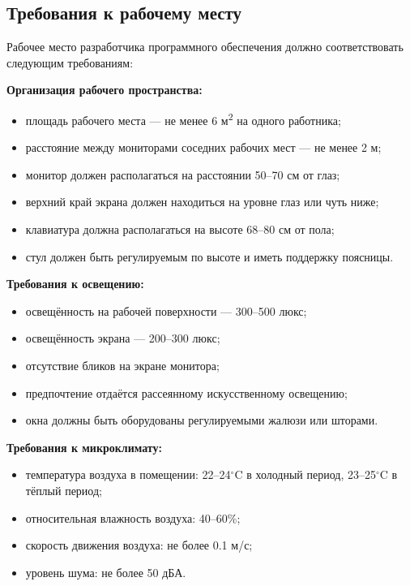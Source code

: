 \documentclass[14pt,a4paper,oneside]{extarticle}
\begin{document}
\subsection{Требования к рабочему месту}

Рабочее место разработчика программного обеспечения должно соответствовать следующим требованиям:

\textbf{Организация рабочего пространства:}
\begin{itemize}[leftmargin=2cm]
    \item площадь рабочего места --- не менее 6 м\textsuperscript{2} на одного работника;
    \item расстояние между мониторами соседних рабочих мест --- не менее 2 м;
    \item монитор должен располагаться на расстоянии 50--70 см от глаз;
    \item верхний край экрана должен находиться на уровне глаз или чуть ниже;
    \item клавиатура должна располагаться на высоте 68--80 см от пола;
    \item стул должен быть регулируемым по высоте и иметь поддержку поясницы.
\end{itemize}

\textbf{Требования к освещению:}
\begin{itemize}[leftmargin=2cm]
    \item освещённость на рабочей поверхности --- 300--500 люкс;
    \item освещённость экрана --- 200--300 люкс;
    \item отсутствие бликов на экране монитора;
    \item предпочтение отдаётся рассеянному искусственному освещению;
    \item окна должны быть оборудованы регулируемыми жалюзи или шторами.
\end{itemize}

\textbf{Требования к микроклимату:}
\begin{itemize}[leftmargin=2cm]
    \item температура воздуха в помещении: 22--24$^{\circ}$C в холодный период, 23--25$^{\circ}$C в тёплый период;
    \item относительная влажность воздуха: 40--60\%;
    \item скорость движения воздуха: не более 0.1 м/с;
    \item уровень шума: не более 50 дБА.
\end{itemize}
\end{document}
